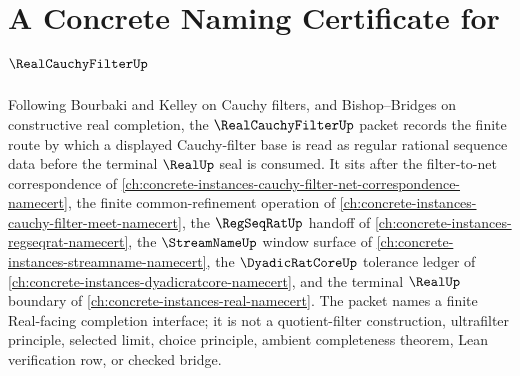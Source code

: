 \chapter{A Concrete Naming Certificate for $\RealCauchyFilterUp$}
\label{ch:concrete-instances-real-cauchy-filter-namecert}

Following Bourbaki and Kelley on Cauchy filters, and Bishop--Bridges on constructive real completion, the $\RealCauchyFilterUp$ packet records the finite route by which a displayed Cauchy-filter base is read as regular rational sequence data before the terminal $\RealUp$ seal is consumed. It sits after the filter-to-net correspondence of \autoref{ch:concrete-instances-cauchy-filter-net-correspondence-namecert}, the finite common-refinement operation of \autoref{ch:concrete-instances-cauchy-filter-meet-namecert}, the $\RegSeqRatUp$ handoff of \autoref{ch:concrete-instances-regseqrat-namecert}, the $\StreamNameUp$ window surface of \autoref{ch:concrete-instances-streamname-namecert}, the $\DyadicRatCoreUp$ tolerance ledger of \autoref{ch:concrete-instances-dyadicratcore-namecert}, and the terminal $\RealUp$ boundary of \autoref{ch:concrete-instances-real-namecert}. The packet names a finite Real-facing completion interface; it is not a quotient-filter construction, ultrafilter principle, selected limit, choice principle, ambient completeness theorem, Lean verification row, or checked bridge.

